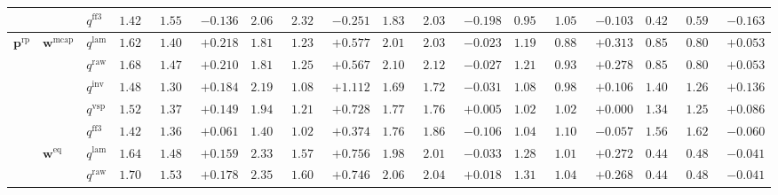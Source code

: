 \documentclass{article}
\begin{document}
\begin{table}[!htbp]
{\begin{tabular}{lll ccc ccc ccc ccc ccc}
 &  & $q^{\mathrm{ff3}}$ & $1.420$ & $1.557$ & \cellcolor{negred!50}$-0.136$ & $2.069$ & $2.320$ & \cellcolor{negred!50}$-0.251$ & $1.835$ & $2.033$ & \cellcolor{negred!50}$-0.198$ & $0.951$ & $1.054$ & \cellcolor{negred!50}$-0.103$ & $0.427$ & $0.590$ & \cellcolor{negred!50}$-0.163$ \\
\midrule
$\mathbf{p}^{\mathrm{rp}}$ & $\mathbf{w}^{\mathrm{mcap}}$ & $q^{\mathrm{lam}}$ & $1.625$ & $1.407$ & \cellcolor{posgreen!50}$+0.218$ & $1.814$ & $1.237$ & \cellcolor{posgreen!50}$+0.577$ & $2.010$ & $2.034$ & \cellcolor{negred!50}$-0.023$ & $1.196$ & $0.883$ & \cellcolor{posgreen!50}$+0.313$ & $0.855$ & $0.802$ & \cellcolor{posgreen!50}$+0.053$ \\
 &  & $q^{\mathrm{raw}}$ & $1.683$ & $1.473$ & \cellcolor{posgreen!50}$+0.210$ & $1.817$ & $1.250$ & \cellcolor{posgreen!50}$+0.567$ & $2.101$ & $2.129$ & \cellcolor{negred!50}$-0.027$ & $1.213$ & $0.935$ & \cellcolor{posgreen!50}$+0.278$ & $0.855$ & $0.802$ & \cellcolor{posgreen!50}$+0.053$ \\
 &  & $q^{\mathrm{inv}}$ & $1.489$ & $1.305$ & \cellcolor{posgreen!50}$+0.184$ & $2.194$ & $1.083$ & \cellcolor{posgreen!50}$+1.112$ & $1.692$ & $1.724$ & \cellcolor{negred!50}$-0.031$ & $1.087$ & $0.981$ & \cellcolor{posgreen!50}$+0.106$ & $1.402$ & $1.266$ & \cellcolor{posgreen!50}$+0.136$ \\
 &  & $q^{\mathrm{vsp}}$ & $1.520$ & $1.371$ & \cellcolor{posgreen!50}$+0.149$ & $1.943$ & $1.215$ & \cellcolor{posgreen!50}$+0.728$ & $1.770$ & $1.765$ & \cellcolor{posgreen!50}$+0.005$ & $1.021$ & $1.021$ & $+0.000$ & $1.342$ & $1.256$ & \cellcolor{posgreen!50}$+0.086$ \\
 &  & $q^{\mathrm{ff3}}$ & $1.421$ & $1.360$ & \cellcolor{posgreen!50}$+0.061$ & $1.400$ & $1.026$ & \cellcolor{posgreen!50}$+0.374$ & $1.763$ & $1.869$ & \cellcolor{negred!50}$-0.106$ & $1.043$ & $1.100$ & \cellcolor{negred!50}$-0.057$ & $1.568$ & $1.627$ & \cellcolor{negred!50}$-0.060$ \\
\cmidrule(lr){2-18}
 & $\mathbf{w}^{\mathrm{eq}}$ & $q^{\mathrm{lam}}$ & $1.647$ & $1.488$ & \cellcolor{posgreen!50}$+0.159$ & $2.335$ & $1.578$ & \cellcolor{posgreen!50}$+0.756$ & $1.985$ & $2.018$ & \cellcolor{negred!50}$-0.033$ & $1.287$ & $1.015$ & \cellcolor{posgreen!50}$+0.272$ & $0.443$ & $0.484$ & \cellcolor{negred!50}$-0.041$ \\
 &  & $q^{\mathrm{raw}}$ & $1.708$ & $1.530$ & \cellcolor{posgreen!50}$+0.178$ & $2.350$ & $1.605$ & \cellcolor{posgreen!50}$+0.746$ & $2.065$ & $2.047$ & \cellcolor{posgreen!50}$+0.018$ & $1.312$ & $1.045$ & \cellcolor{posgreen!50}$+0.268$ & $0.443$ & $0.484$ & \cellcolor{negred!50}$-0.041$ \\

\end{tabular}}
\end{table}
\end{document}
